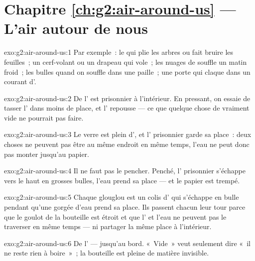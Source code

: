 \section*{Chapitre \ref{ch:g2:air-around-us} --- L'air autour de nous}

\begin{solution}{exo:g2:air-around-us:1}
Par exemple~: le  qui plie les arbres ou fait bruire les
feuilles~; un cerf-volant ou un drapeau qui vole~; les nuages de
souffle un matin froid~; les bulles quand on souffle dans une
paille~; une porte qui claque dans un courant d'.
\end{solution}

\begin{solution}{exo:g2:air-around-us:2}
De l' est prisonnier à l'intérieur. En pressant, on essaie de
tasser l' dans moins de place, et l' repousse --- ce que
quelque chose de vraiment vide ne pourrait pas faire.
\end{solution}

\begin{solution}{exo:g2:air-around-us:3}
Le verre est plein d', et l' prisonnier garde sa place~: deux
choses ne peuvent pas être au même endroit en même temps, l'eau ne
peut donc pas monter jusqu'au papier.
\end{solution}

\begin{solution}{exo:g2:air-around-us:4}
Il ne faut pas le pencher. Penché, l' prisonnier s'échappe vers le
haut en grosses bulles, l'eau prend sa place --- et le papier est
trempé.
\end{solution}

\begin{solution}{exo:g2:air-around-us:5}
Chaque glouglou est un colis d' qui s'échappe en bulle pendant
qu'une gorgée d'eau prend sa place. Ils passent chacun leur tour
parce que le goulot de la bouteille est étroit et que l' et l'eau
ne peuvent pas le traverser en même temps --- ni partager la même
place à l'intérieur.
\end{solution}

\begin{solution}{exo:g2:air-around-us:6}
De l' --- jusqu'au bord. «~Vide~» veut seulement dire «~il ne
reste rien à boire~»~; la bouteille est pleine de matière invisible.
\end{solution}

